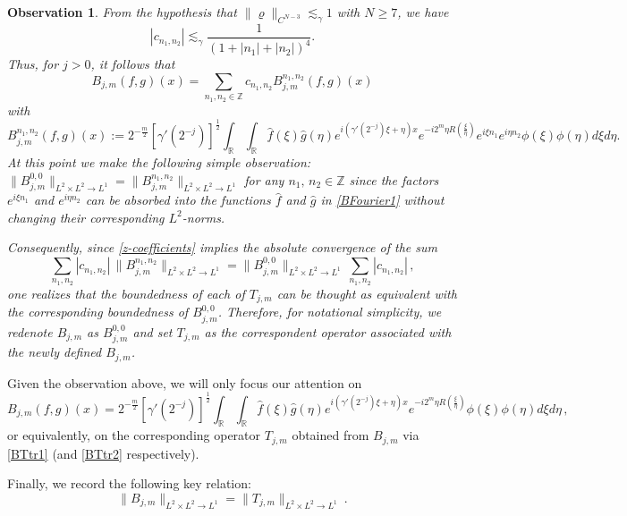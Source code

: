 \documentclass{amsart}
\newcommand{\R}{\mathbb{R}}
\newcommand{\Z}{\mathbb{Z}}
\newtheorem{observation}[theorem]{Observation}
\theoremstyle{definition}
\theoremstyle{remark}
\numberwithin{equation}{section}
\begin{document}
\begin{observation}
From the hypothesis that $\|\varrho\|_{C^{N-3}}\lesssim_\gamma 1$ with $N\geq 7$, we have
\begin{equation}\label{z-coefficients}
|c_{n_1,n_2}|\lesssim_\gamma \frac{1}{(1+|n_1|+|n_2|)^4}.
\end{equation}
Thus, for $j>0$, it follows that
\begin{equation}\label{B-Fourier}
B_{j,m}(f,g)(x)=\sum_{n_1,n_2\in\Z}c_{n_1,n_2}B_{j,m}^{n_1,n_2}(f,g)(x)
\end{equation}
with
\begin{equation}\label{BFourier1}
B_{j,m}^{n_1,n_2}(f,g)(x):=2^{-\frac{m}{2}}[\gamma'(2^{-j})]^\frac{1}{2}
\int_\R \int_\R \hat{f}(\xi)\hat{g}(\eta)e^{i(\gamma'(2^{-j})\xi+\eta)x}e^{-i
	2^m \eta R(\frac{\xi}{\eta})}e^{i\xi n_1}e^{i\eta n_2}\phi(\xi)\phi(\eta)d\xi d\eta.
\end{equation}
At this point we make the following simple observation: $\|B_{j,m}^{0,0}\|_{L^2\times L^2 \to L^1}=\|B_{j,m}^{n_1,n_2}\|_{L^2\times L^2 \to L^1}$ for any $n_1,\,n_2\in \Z$ since
the factors $e^{i\xi n_1}$ and $e^{i\eta n_2}$ can be absorbed into the functions $\hat f$ and $\hat g$ in \eqref{BFourier1} without changing their corresponding $L^2$-norms.

Consequently, since \eqref{z-coefficients} implies the absolute convergence of the sum $$\sum_{n_1,n_2}|c_{n_1,n_2}|\,\|B_{j,m}^{n_1,n_2}\|_{L^2\times L^2 \to L^1}=\|B_{j,m}^{0,0}\|_{L^2\times L^2 \to L^1}\,\sum_{n_1,n_2}|c_{n_1,n_2}|\,,$$
one realizes that the boundedness of each of $T_{j,m}$ can be thought as equivalent with the corresponding boundedness of $B_{j,m}^{0,0}$. Therefore, for notational simplicity, we redenote $B_{j,m}$ as $B_{j,m}^{0,0}$ and set $T_{j,m}$ as the correspondent operator associated with the newly defined $B_{j,m}$.
\end{observation}

Given the observation above, we will only focus our attention on
\begin{equation}\label{nbjxm}
 B_{j,m}(f,g)(x)=2^{-\frac{m}{2}}[\gamma'(2^{-j})]^\frac{1}{2} \int_\R \int_\R \hat{f}(\xi)\hat{g}(\eta)e^{i(\gamma'(2^{-j})\xi+\eta)x} e^{-i 2^m\eta R(\frac{\xi}{\eta})}\phi(\xi)\phi(\eta)d\xi d\eta\,,
\end{equation}
or equivalently, on the corresponding operator $T_{j,m}$ obtained from $B_{j,m}$ via \eqref{BTtr1} (and \eqref{BTtr2} respectively).

Finally, we record the following key relation:
\begin{equation}\label{bt}
\|B_{j,m}\|_{L^2\times L^2 \to L^1}=\|T_{j,m}\|_{L^2\times L^2 \to L^1}\:.
\end{equation}
\end{document}
